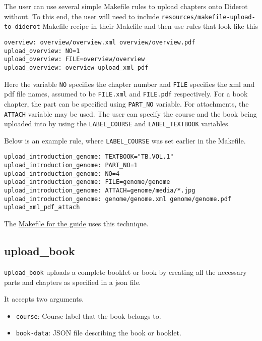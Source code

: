 \begin{gram}
The user can use several simple Makefile rules to upload chapters onto
Diderot without.  To this end, the user will need to include
\verb|resources/makefile-upload-to-diderot| Makefile recipe in their
Makefile and then use rules that look like this
\begin{verbatim}
overview: overview/overview.xml overview/overview.pdf
upload_overview: NO=1
upload_overview: FILE=overview/overview
upload_overview: overview upload_xml_pdf
\end{verbatim}

Here the variable \verb|NO| specifies the chapter number and \verb|FILE| specifies the xml and pdf file names, assumed to be \verb|FILE.xml| and \verb|FILE.pdf| respectively.  
%
For a book chapter, the part can be specified using \verb|PART_NO| variable.
%
For attachments, the \verb|ATTACH| variable may be used.
%
The user can specify the course and the book being uploaded into by using the
\verb|LABEL_COURSE| and \verb|LABEL_TEXTBOOK| variables. 

Below is an example rule, where \verb|LABEL_COURSE| was set earlier in the Makefile.


\begin{verbatim}
upload_introduction_genome: TEXTBOOK="TB.VOL.1"
upload_introduction_genome: PART_NO=1 
upload_introduction_genome: NO=4
upload_introduction_genome: FILE=genome/genome
upload_introduction_genome: ATTACH=genome/media/*.jpg 
upload_introduction_genome: genome/genome.xml genome/genome.pdf upload_xml_pdf_attach
\end{verbatim}
\end{gram}

\begin{gram}
The \href{file://cli/attachments/Makefile-guide}{Makefile for the guide} uses this technique.

\end{gram}

\subsection{upload\_book}

\begin{gram}
\verb|upload_book| uploads a complete booklet or book by creating all the necessary parts and chapters as specified in a json file.

It accepts two arguments.
%
\begin{itemize}
  \item \verb|course|: Course label that the book belongs to.
  \item \verb|book-data|: JSON file describing the book or booklet.
\end{itemize}
\end{gram}

